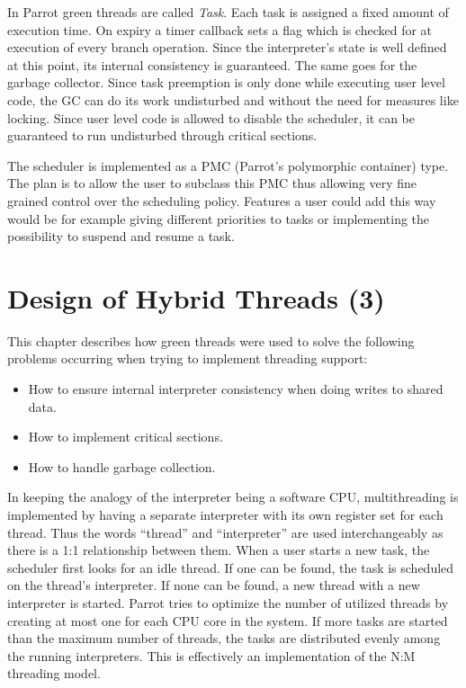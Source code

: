 \documentclass[bachelor,english]{hgbthesis}
\begin{document}
In Parrot green threads are called \textit{Task}. Each task is assigned a fixed amount of execution time. On expiry a timer callback sets a flag which is checked for at execution of every branch operation. Since the interpreter's state is well defined at this point, its internal consistency is guaranteed. The same goes for the garbage collector. Since task preemption is only done while executing user level code, the GC can do its work undisturbed and without the need for measures like locking. Since user level code is allowed to disable the scheduler, it can be guaranteed to run undisturbed through critical sections.

The scheduler is implemented as a PMC (Parrot's polymorphic container) type. The plan is to allow the user to subclass this PMC thus allowing very fine grained control over the scheduling policy. Features a user could add this way would be for example giving different priorities to tasks or implementing the possibility to suspend and resume a task.

\chapter{Design of Hybrid Threads (3)}
\label{cha:design}

This chapter describes how green threads were used to solve the following problems occurring when trying to implement threading support:
%
\begin{itemize}
\item How to ensure internal interpreter consistency when doing writes to shared data.
\item How to implement critical sections.
\item How to handle garbage collection.
\end{itemize}

In keeping the analogy of the interpreter being a software CPU, multithreading is implemented by having a separate interpreter with its own register set for each thread. Thus the words ``thread'' and ``interpreter'' are used interchangeably as there is a 1:1 relationship between them. When a user starts a new task, the scheduler first looks for an idle thread. If one can be found, the task is scheduled on the thread's interpreter. If none can be found, a new thread with a new interpreter is started. Parrot tries to optimize the number of utilized threads by creating at most one for each CPU core in the system. If more tasks are started than the maximum number of threads, the tasks are distributed evenly among the running interpreters. This is effectively an implementation of the N:M threading model.
\end{document}
